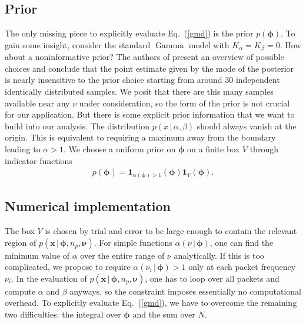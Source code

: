 \documentclass[11pt]{article}
\newcommand{\cond}{\,|\,}
\newcommand{\bmx}{{{\bm{x}}}}
\newcommand{\bmphi}{{\bm{\phi}}}
\newcommand{\bmnu}{{\bm{\nu}}}
\newcommand{\refeq}[1]{Eq.~(\ref{#1})}
\DeclareMathOperator{\GammaDist}{Gamma}
\newcommand{\Kalpha}{{K_\alpha}}
\newcommand{\Kbeta}{{K_\beta}}
\newcommand{\npack}{n_p}
\begin{document}
\subsection{Prior} \label{sec:priors}

The only missing piece to explicitly evaluate \refeq{gmd} is the prior
$p(\bmphi)$. To gain some insight, consider the standard $\GammaDist$
model with $\Kalpha = \Kbeta = 0$.
How about a noninformative prior? The authors of
\cite{moala2013bayesian} present an overview of possible choices and
conclude that the point estimate given by the mode of the posterior is
nearly insensitive to the prior choice starting from around 30
independent identically distributed samples. We posit that there are
this many samples available near any $\nu$ under consideration, so the
form of the prior is not crucial for our application. But there is
some explicit prior information that we want to build into our
analysis. The distribution $p(x \cond \alpha, \beta)$ should always
vanish at the origin. This is equivalent to requiring a maximum away
from the boundary leading to $\alpha > 1$. We choose a uniform prior
on $\bmphi$ on a finite box $V$ through indicator functions
\begin{align}
  p(\bmphi) = \mathbf{1}_{\alpha(\bmphi) > 1}(\bmphi) \mathbf{1}_V(\bmphi).
\end{align}

\subsection{Numerical implementation} \label{sec:numerical}

The box $V$ is chosen by trial and error to be large enough to contain
the relevant region of $p(\bmx\cond \bmphi, \npack, \bmnu)$. For
simple functions $\alpha(\nu \cond \bmphi)$, one can find the minimum
value of $\alpha$ over the entire range of $\nu$ analytically. If this
is too complicated, we propose to require $\alpha(\nu_i \cond \bmphi)
> 1$ only at each packet frequency $\nu_i$. In the evaluation of
$p(\bmx \cond \bmphi, \npack, \bmnu)$, one has to loop over all
packets and compute $\alpha$ and $\beta$ anyways, so the constraint
imposes essentially no computational overhead.  To explicitly evaluate
\refeq{gmd}, we have to overcome the remaining two difficulties: the
integral over $\bmphi$ and the sum over $N$.
\end{document}
